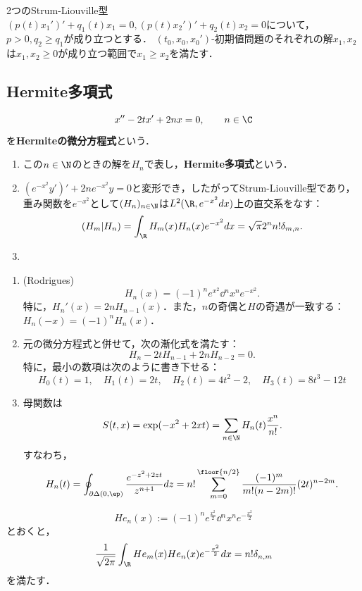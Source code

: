 \documentclass[uplatex,dvipdfmx]{jsreport}
\begin{document}
\begin{theorem}[Strumの比較原理]
    2つのStrum-Liouville型$(p(t)x_1')'+q_1(t)x_1=0,(p(t)x_2')'+q_2(t)x_2=0$について，
    $p>0,q_2\ge q_1$が成り立つとする．
    $(t_0,x_0,x_0')$-初期値問題のそれぞれの解$x_1,x_2$は$x_1,x_2\ge0$が成り立つ範囲で$x_1\ge x_2$を満たす．
\end{theorem}

\subsection{Hermite多項式}

\begin{problem}
    \[x''-2tx'+2nx=0,\qquad n\in\C\]
    を\textbf{Hermiteの微分方程式}という．
    \begin{enumerate}
        \item この$n\in\N$のときの解を$H_n$で表し，\textbf{Hermite多項式}という．
        \item $(e^{-x^2}y')'+2ne^{-x^2}y=0$と変形でき，したがってStrum-Liouville型であり，重み関数を$e^{-x^2}$として$(H_n)_{n\in\N}$は$L^2(\R,e^{-x^2}dx)$上の直交系をなす：
        \[(H_m|H_n)=\int_\R H_m(x)H_n(x)e^{-x^2}dx=\sqrt{\pi}2^nn!\delta_{m,n}.\]
        \item 
    \end{enumerate}
\end{problem}

\begin{proposition}\mbox{}
    \begin{enumerate}
        \item (Rodrigues) 
        \[H_n(x)=(-1)^ne^{x^2}\dd{^n}{x^n}e^{-x^2}.\]
        特に，$H_n'(x)=2nH_{n-1}(x)$．また，$n$の奇偶と$H$の奇遇が一致する：$H_n(-x)=(-1)^nH_n(x)$．
        \item 元の微分方程式と併せて，次の漸化式を満たす：
        \[H_n-2tH_{n-1}+2nH_{n-2}=0.\]
        特に，最小の数項は次のように書き下せる：
        \[H_0(t)=1,\quad H_1(t)=2t,\quad H_2(t)=4t^2-2,\quad H_3(t)=8t^3-12t\]
        \item 母関数は
        \[S(t,x)=\exp(-x^2+2xt)=\sum_{n\in\N}H_n(t)\frac{x^n}{n!}.\]
        すなわち，
        \[H_n(t)=\oint_{\partial\Delta(0,\ep)}\frac{e^{-z^2+2zt}}{z^{n+1}}dz=n!\sum_{m=0}^{\floor{n/2}}\frac{(-1)^m}{m!(n-2m)!}(2t)^{n-2m}.\]
    \end{enumerate}
\end{proposition}

\begin{remarks}
    \[He_n(x):=(-1)^ne^{\frac{x^2}{2}}\dd{^n}{x^n}e^{-\frac{x^2}{2}}\]
    とおくと，
    \[\frac{1}{\sqrt{2\pi}}\int_\R He_m(x)He_n(x)e^{-\frac{x^2}{2}}dx=n!\delta_{n,m}\]
    を満たす．
\end{remarks}
\end{document}
